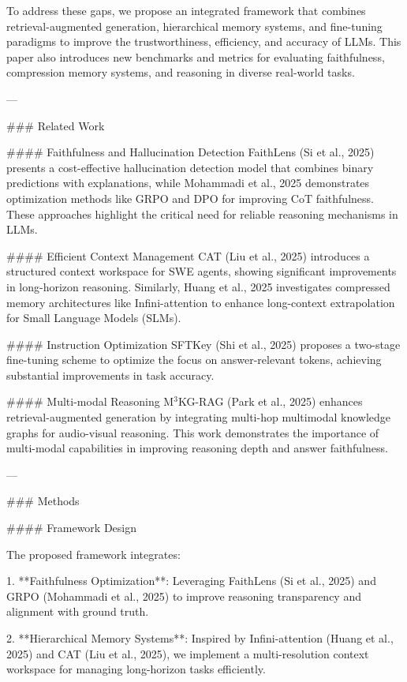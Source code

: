 To address these gaps, we propose an integrated framework that combines retrieval-augmented generation, hierarchical memory systems, and fine-tuning paradigms to improve the trustworthiness, efficiency, and accuracy of LLMs. This paper also introduces new benchmarks and metrics for evaluating faithfulness, compression memory systems, and reasoning in diverse real-world tasks.  

---

### Related Work  

#### Faithfulness and Hallucination Detection  
FaithLens (Si et al., 2025) presents a cost-effective hallucination detection model that combines binary predictions with explanations, while Mohammadi et al., 2025 demonstrates optimization methods like GRPO and DPO for improving CoT faithfulness. These approaches highlight the critical need for reliable reasoning mechanisms in LLMs.  

#### Efficient Context Management  
CAT (Liu et al., 2025) introduces a structured context workspace for SWE agents, showing significant improvements in long-horizon reasoning. Similarly, Huang et al., 2025 investigates compressed memory architectures like Infini-attention to enhance long-context extrapolation for Small Language Models (SLMs).  

#### Instruction Optimization  
SFTKey (Shi et al., 2025) proposes a two-stage fine-tuning scheme to optimize the focus on answer-relevant tokens, achieving substantial improvements in task accuracy.  

#### Multi-modal Reasoning  
M$^3$KG-RAG (Park et al., 2025) enhances retrieval-augmented generation by integrating multi-hop multimodal knowledge graphs for audio-visual reasoning. This work demonstrates the importance of multi-modal capabilities in improving reasoning depth and answer faithfulness.  

---

### Methods  

#### Framework Design  

The proposed framework integrates:  

1. **Faithfulness Optimization**: Leveraging FaithLens (Si et al., 2025) and GRPO (Mohammadi et al., 2025) to improve reasoning transparency and alignment with ground truth.  

2. **Hierarchical Memory Systems**: Inspired by Infini-attention (Huang et al., 2025) and CAT (Liu et al., 2025), we implement a multi-resolution context workspace for managing long-horizon tasks efficiently.  

